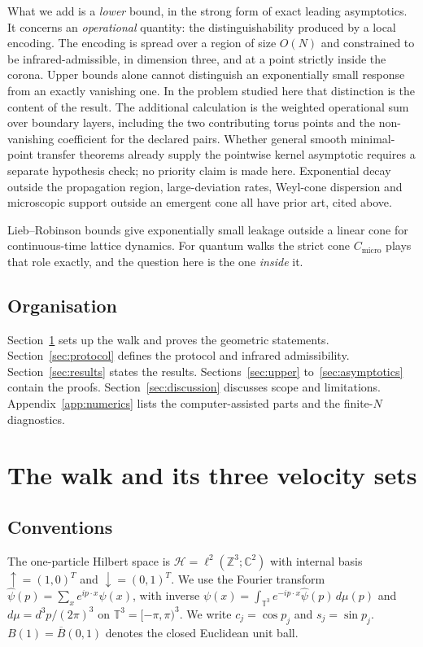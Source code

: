 \documentclass[11pt]{amsart}
\theoremstyle{definition}
\theoremstyle{remark}
\newcommand{\Z}{\mathbb{Z}}
\newcommand{\C}{\mathbb{C}}
\newcommand{\T}{\mathbb{T}}
\newcommand{\up}{{\uparrow}}
\newcommand{\dn}{{\downarrow}}
\newcommand{\Cmicro}{C_{\mathrm{micro}}}
\begin{document}
What we add is a \emph{lower} bound, in the strong form of exact leading
asymptotics.  It concerns an \emph{operational} quantity: the
distinguishability produced by a local encoding.  The encoding is spread
over a region of size $O(N)$ and constrained to be infrared-admissible, in
dimension three, and at a point strictly inside the corona.  Upper bounds
alone cannot distinguish an exponentially small response from an exactly
vanishing one.  In the problem studied here that distinction is the
content of the result. The additional calculation is the weighted operational
sum over boundary layers, including the two contributing torus points and
the non-vanishing coefficient for the declared pairs. Whether general smooth
minimal-point transfer theorems already supply the pointwise kernel
asymptotic requires a separate hypothesis check; no priority claim is made
here. Exponential decay outside the propagation
region, large-deviation rates, Weyl-cone dispersion and microscopic support
outside an emergent cone all have prior art, cited above.

Lieb--Robinson bounds \cite{LiebRobinson,BHV} give exponentially small
leakage outside a linear cone for continuous-time lattice dynamics.  For
quantum walks the strict cone $\Cmicro$ plays that role exactly, and the
question here is the one \emph{inside} it.

\subsection*{Organisation}
Section~\ref{sec:walk} sets up the walk and proves the geometric statements.
Section~\ref{sec:protocol} defines the protocol and infrared admissibility.
Section~\ref{sec:results} states the results.  Sections~\ref{sec:upper}
to~\ref{sec:asymptotics} contain the proofs.  Section~\ref{sec:discussion}
discusses scope and limitations.  Appendix~\ref{app:numerics} lists the
computer-assisted parts and the finite-$N$ diagnostics.

\section{The walk and its three velocity sets}\label{sec:walk}

\subsection{Conventions}
The one-particle Hilbert space is $\mathcal H=\ell^2(\Z^3;\C^2)$ with
internal basis $\up=(1,0)^T$ and $\dn=(0,1)^T$.  We use the Fourier
transform $\hat\psi(p)=\sum_{x}e^{ip\cdot x}\psi(x)$, with inverse
$\psi(x)=\int_{\T^3}e^{-ip\cdot x}\hat\psi(p)\,d\mu(p)$ and
$d\mu=d^3p/(2\pi)^3$ on $\T^3=[-\pi,\pi)^3$.  We write $c_j=\cos p_j$ and
$s_j=\sin p_j$.  $B(1)=\overline B(0,1)$ denotes the closed Euclidean unit
ball.
\end{document}
